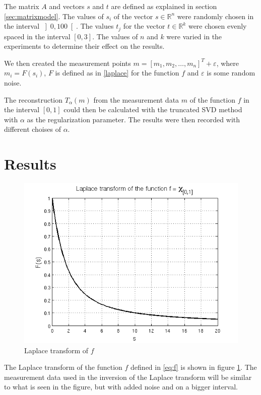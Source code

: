 \documentclass[12pt,a4]{article}
\newcommand{\R}{{\mathbb R}}
\newcommand{\eps}{\varepsilon}
\begin{document}
The matrix $A$ and vectors $s$ and $t$ are defined as explained in section \ref{sec:matrixmodel}. The values of $s_i$ of the vector $s \in \R^n$ were randomly chosen in the interval $\left] 0, 100 \right[$. The values $t_j$ for the vector $t \in \R^k$ were chosen evenly spaced in the interval $\left[ 0,3 \right]$. The values of $n$ and $k$ were varied in the experiments to determine their effect on the results.

We then created the measurement points $m = [m_1, m_2, \ldots, m_n]^T + \eps$, where $m_i = F(s_i)$, $F$ is defined as in \eqref{laplace} for the function $f$ and $\eps$ is some random noise.

The reconstruction $T_\alpha(m)$ from the measurement data $m$ of the function $f$ in the interval $\left[0,1\right]$ could then be calculated with the truncated SVD method with $\alpha$ as the regularization parameter. The results were then recorded with different choises of $\alpha$.



\section{Results}\label{sec:results}

\begin{figure}[t]
\begin{center}
\includegraphics[scale=.6]{img/laplace.png}
\end{center}
\caption{Laplace transform of $f$}
\label{fig:laplace}
\end{figure}

The Laplace transform of the function $f$ defined in \eqref{eq:f} is shown in figure \ref{fig:laplace}. The measurement data used in the inversion of the Laplace transform will be similar to what is seen in the figure, but with added noise and on a bigger interval.
\end{document}
